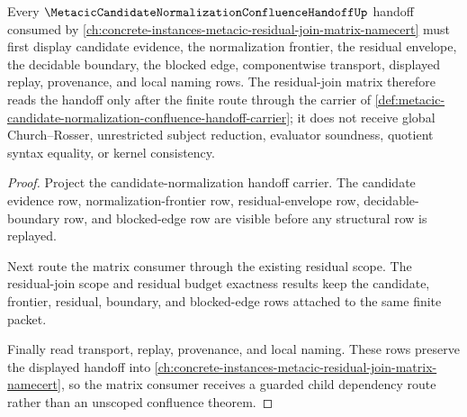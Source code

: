 \begin{theorem}
\label{thm:metacic-candidate-normalization-confluence-handoff-residual-matrix-forward-route}
Every $\MetacicCandidateNormalizationConfluenceHandoffUp$ handoff consumed by \autoref{ch:concrete-instances-metacic-residual-join-matrix-namecert} must first display candidate evidence, the normalization frontier, the residual envelope, the decidable boundary, the blocked edge, componentwise transport, displayed replay, provenance, and local naming rows. The residual-join matrix therefore reads the handoff only after the finite route through the carrier of \autoref{def:metacic-candidate-normalization-confluence-handoff-carrier}; it does not receive global Church--Rosser, unrestricted subject reduction, evaluator soundness, quotient syntax equality, or kernel consistency.
\end{theorem}
\begin{proof}
Project the candidate-normalization handoff carrier. The candidate evidence row, normalization-frontier row, residual-envelope row, decidable-boundary row, and blocked-edge row are visible before any structural row is replayed.

Next route the matrix consumer through the existing residual scope. The residual-join scope and residual budget exactness results keep the candidate, frontier, residual, boundary, and blocked-edge rows attached to the same finite packet.

Finally read transport, replay, provenance, and local naming. These rows preserve the displayed handoff into \autoref{ch:concrete-instances-metacic-residual-join-matrix-namecert}, so the matrix consumer receives a guarded child dependency route rather than an unscoped confluence theorem.
\end{proof}
